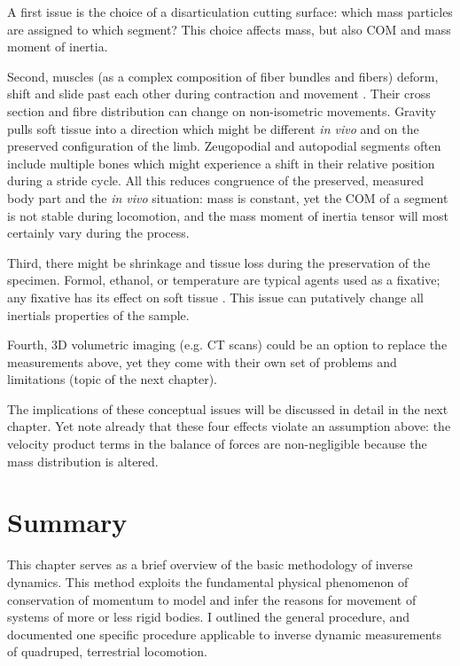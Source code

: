 A first issue is the choice of a disarticulation cutting surface: which mass particles are assigned to which segment?
This choice affects mass, but also COM and mass moment of inertia.

Second, muscles (as a complex composition of fiber bundles and fibers) deform, shift and slide past each other during contraction and movement \citep{Bol2013}.
Their cross section and fibre distribution can change on non-isometric movements.
Gravity pulls soft tissue into a direction \citep{Hansraj2022} which might be different \emph{in vivo} and on the preserved configuration of the limb.
Zeugopodial and autopodial segments often include multiple bones which might experience a shift in their relative position during a stride cycle.
All this reduces congruence of the preserved, measured body part and the \emph{in vivo} situation: mass is constant, yet the COM of a segment is not stable during locomotion, and the mass moment of inertia tensor will most certainly vary during the process.

Third, there might be shrinkage and tissue loss during the preservation of the specimen.
Formol, ethanol, or temperature are typical agents used as a fixative; any fixative has its effect on soft tissue \citep{Buytaert2014,Pech1987}.
This issue can putatively change all inertials properties of the sample.

Fourth, 3D volumetric imaging (e.g. CT scans) could be an option to replace the measurements above, yet they come with their own set of problems and limitations (topic of the next chapter).


The implications of these conceptual issues will be discussed in detail in the next chapter.
Yet note already that these four effects violate an assumption above: the velocity product terms in the balance of forces are non-negligible because the mass distribution is altered.


\clearpage
\section{Summary}
\label{sec:org937fa2b}
This chapter serves as a brief overview of the basic methodology of inverse dynamics.
This method exploits the fundamental physical phenomenon of conservation of momentum to model and infer the reasons for movement of systems of more or less rigid bodies.
I outlined the general procedure, and documented one specific procedure applicable to inverse dynamic measurements of quadruped, terrestrial locomotion.


